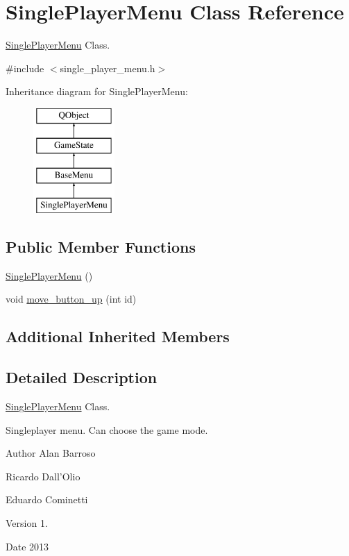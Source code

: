 \hypertarget{class_single_player_menu}{\section{Single\-Player\-Menu Class Reference}
\label{class_single_player_menu}
}


\hyperlink{class_single_player_menu}{Single\-Player\-Menu} Class.  




{\ttfamily \#include $<$single\-\_\-player\-\_\-menu.\-h$>$}

Inheritance diagram for Single\-Player\-Menu\-:\begin{figure}[H]
\begin{center}
\leavevmode
\includegraphics[height=4.000000cm]{class_single_player_menu}
\end{center}
\end{figure}
\subsection*{Public Member Functions}
\begin{DoxyCompactItemize}
\item 
\hyperlink{class_single_player_menu_ae08904afd98c7acdc73afe9722c3af27}{Single\-Player\-Menu} ()
\item 
void \hyperlink{class_single_player_menu_a8a05cbb8626a73ea18fe32e2eb4ec61f}{move\-\_\-button\-\_\-up} (int id)
\end{DoxyCompactItemize}
\subsection*{Additional Inherited Members}


\subsection{Detailed Description}
\hyperlink{class_single_player_menu}{Single\-Player\-Menu} Class. 

Singleplayer menu. Can choose the game mode. \begin{DoxyAuthor}{Author}
Alan Barroso 

Ricardo Dall'Olio 

Eduardo Cominetti 
\end{DoxyAuthor}
\begin{DoxyVersion}{Version}
1. 
\end{DoxyVersion}
\begin{DoxyDate}{Date}
2013 
\end{DoxyDate}


